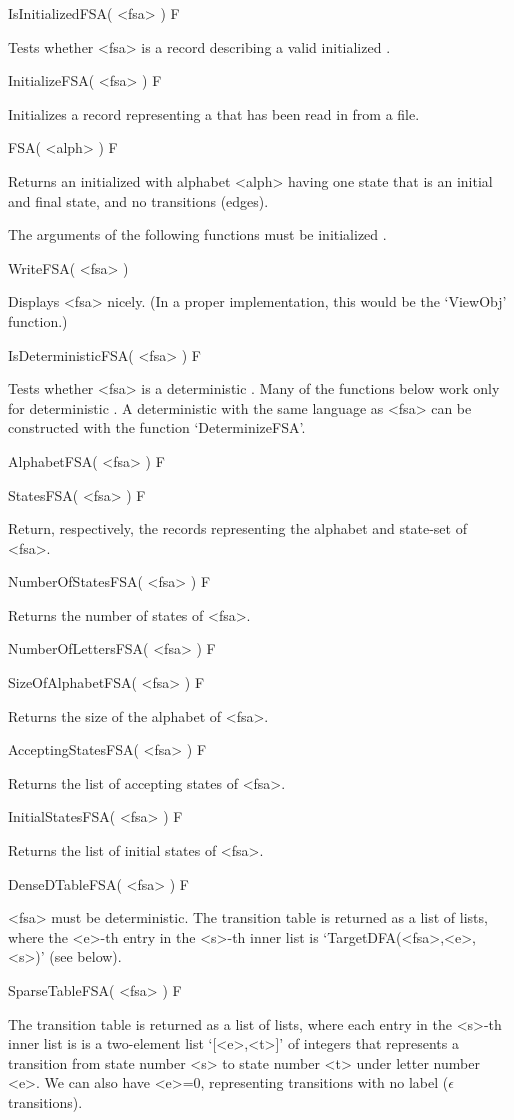 \>IsInitializedFSA( <fsa> ) F

Tests whether <fsa> is a record describing a valid initialized {\fsa}.

\>InitializeFSA( <fsa> ) F

Initializes a record representing a {\fsa} that has been read in from
a file.

\>FSA( <alph> ) F

Returns an initialized {\fsa} with alphabet <alph> having one state that is
an initial and final state, and no transitions (edges).

The arguments of the following functions must be initialized {\fsa}.

\>WriteFSA( <fsa> )

Displays <fsa> nicely. (In a proper implementation, this would be the
`ViewObj' function.)

\>IsDeterministicFSA( <fsa> ) F

Tests whether <fsa> is a deterministic {\fsa}.
Many of the functions below work only for deterministic {\fsa}.
A deterministic {\fsa} with the same language as <fsa> can
be constructed with the function `DeterminizeFSA'.

\>AlphabetFSA( <fsa> ) F

\>StatesFSA( <fsa> ) F

Return, respectively, the records representing the alphabet and state-set
of <fsa>.

\>NumberOfStatesFSA( <fsa> ) F

Returns the number of states of <fsa>.

\>NumberOfLettersFSA( <fsa> ) F

\>SizeOfAlphabetFSA( <fsa> ) F

Returns the size of the alphabet of <fsa>.

\>AcceptingStatesFSA( <fsa> ) F

Returns the list of accepting states of <fsa>.

\>InitialStatesFSA( <fsa> ) F

Returns the list of initial states of <fsa>.

\>DenseDTableFSA( <fsa> ) F

<fsa> must be deterministic. The transition table is returned as a list
of lists, where the <e>-th entry in the <s>-th inner list is
`TargetDFA(<fsa>,<e>,<s>)' (see below).

\>SparseTableFSA( <fsa> ) F

The transition table is returned as a list of lists,
where each entry in the <s>-th inner list is
is a two-element list `[<e>,<t>]' of integers that represents a transition
from state number <s> to state number <t> under letter number <e>.
We can also have <e>=0, representing transitions with no label
($\epsilon$ transitions).

